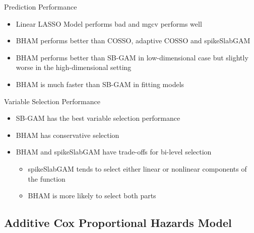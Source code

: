 \documentclass[
  ignorenonframetext,
  aspectratio=169]{beamer}
\providecommand{\tightlist}{%
  \setlength{\itemsep}{0pt}\setlength{\parskip}{0pt}}
\begin{document}
\begin{frame}{Prediction Performance}
\protect\hypertarget{prediction-performance}{}
\begin{itemize}
\tightlist
\item
  Linear LASSO Model performs bad and mgcv performs well
\item
  BHAM performs better than COSSO, adaptive COSSO and spikeSlabGAM
\item
  BHAM performs better than SB-GAM in low-dimensional case but slightly
  worse in the high-dimensional setting
\item
  BHAM is much faster than SB-GAM in fitting models
\end{itemize}
\end{frame}

\begin{frame}{Variable Selection Performance}
\protect\hypertarget{variable-selection-performance}{}
\begin{itemize}
\tightlist
\item
  SB-GAM has the best variable selection performance
\item
  BHAM has conservative selection
\item
  BHAM and spikeSlabGAM have trade-offs for bi-level selection

  \begin{itemize}
  \tightlist
  \item
    spikeSlabGAM tends to select either linear or nonlinear components
    of the function
  \item
    BHAM is more likely to select both parts
  \end{itemize}
\end{itemize}
\end{frame}

\hypertarget{additive-cox-proportional-hazards-model}{%
\subsection{Additive Cox Proportional Hazards
Model}\label{additive-cox-proportional-hazards-model}}
\end{document}
